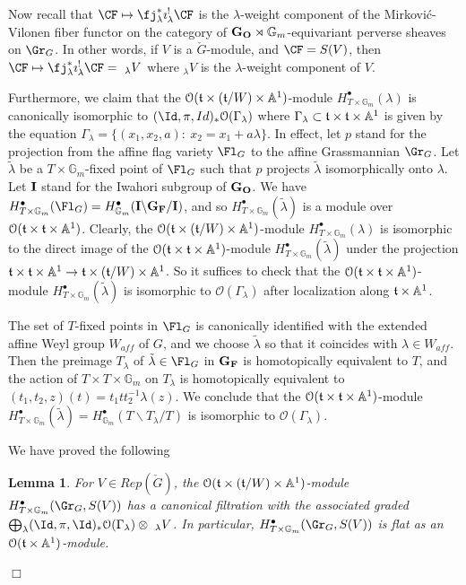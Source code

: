 \documentclass[11pt]{amsart}
\newtheorem{lem}{Lemma}
\theoremstyle{definition}
\theoremstyle{remark}
\renewcommand{\O}{{\mathcal O}}
\theoremstyle{remark}
\newcommand{\cal}{\mathcal}
\newcommand{\<}{\langle}
\renewcommand{\>}{\rangle}
\renewcommand{\t}{{\frak t}}
\newcommand{\LG}{{\check{G}}}
\renewcommand{\O}{{\cal O}}
\newcommand{\bI}{{\bf I}}
\newcommand{\GO}{{\bf G_O}}
\newcommand{\GF}{{\bf G_F}}
\newcommand{\Aone}{{\mathbb A}^1}
\newcommand{\Gm}{{{\mathbb G}_m}}
\begin{document}
Now recall that $\CF\mapsto\fj_\lambda^*\imath_\lambda^!\CF$ is the
$\lambda$-weight component of the Mirkovi\'c-Vilonen fiber functor on
the category of $\GO\rtimes\Gm$-equivariant perverse sheaves on $\Gr_G$.
In other words, if $V$ is a $\LG$-module, and $\CF=S(V)$, then
$\CF\mapsto\fj_\lambda^*\imath_\lambda^!\CF=\ _\lambda V$ where
$_\lambda V$ is the $\lambda$-weight component of $V$.

Furthermore, we claim that the $\O(\t\times(\t/W)\times\Aone)$-module
$H^\bullet_{T\times\Gm}(\lambda)$ is canonically isomorphic to
$(\Id,\pi,Id)_*\O(\Gamma_\lambda)$ where 
$\Gamma_\lambda\subset\t\times\t\times\Aone$ is given by the equation
$\Gamma_\lambda=\{(x_1,x_2,a):\ x_2=x_1+a\lambda\}$. In effect, 
let $p$ stand for the projection from the affine flag variety $\Fl_G$ to
the affine Grassmannian $\Gr_G$. Let $\tilde\lambda$ be a 
$T\times\Gm$-fixed point of $\Fl_G$ such that $p$ projects $\tilde\lambda$
isomorphically onto $\lambda$. Let $\bI$ stand for the Iwahori subgroup of
$\GO$. We have $H^\bullet_{T\times\Gm}(\Fl_G)=
H^\bullet_\Gm(\bI\backslash\GF/\bI)$, and so 
$H^\bullet_{T\times\Gm}({\tilde\lambda})$
is a module over $\O(\t\times\t\times\Aone)$. Clearly, the 
$\O(\t\times(\t/W)\times\Aone)$-module $H^\bullet_{T\times\Gm}(\lambda)$ is
isomorphic to the direct image of the 
$\O(\t\times\t\times\Aone)$-module $H^\bullet_{T\times\Gm}({\tilde\lambda})$
under the projection $\t\times\t\times\Aone\to\t\times(\t/W)\times\Aone$.
So it suffices to check that the
$\O(\t\times\t\times\Aone)$-module $H^\bullet_{T\times\Gm}({\tilde\lambda})$
is isomorphic to $\O(\Gamma_\lambda)$ after localization along $\t\times\Aone$.

The set of $T$-fixed points in $\Fl_G$ is canonically identified with the
extended affine Weyl group $W_{aff}$ of $G$, and we choose $\tilde\lambda$
so that it coincides 
with $\lambda\in W_{aff}$. Then the preimage $T_\lambda$ of 
${\tilde\lambda}\in\Fl_G$ in $\GF$ is homotopically equivalent to 
$T$, and the action of $T\times T\times\Gm$ on $T_\lambda$ is homotopically
equivalent to $(t_1,t_2,z)(t)=t_1tt_2^{-1}\lambda(z)$. We conclude that the
$\O(\t\times\t\times\Aone)$-module $H^\bullet_{T\times\Gm}({\tilde\lambda})=
H^\bullet_\Gm(T\backslash T_\lambda/T)$
is isomorphic to $\O(\Gamma_\lambda)$.

We have proved the following

\begin{lem}
\label{Harvard}
For $V\in Rep(\LG)$, the $\O(\t\times(\t/W)\times\Aone)$-module
$H^\bullet_{T\times\Gm}(\Gr_G,S(V))$ has a canonical filtration with
the associated graded $\bigoplus_\lambda (\Id,\pi,\Id)_*
\O(\Gamma_\lambda)\otimes\ _\lambda V$. In particular, 
$H^\bullet_{T\times\Gm}(\Gr_G,S(V))$ is flat as an $\O(\t\times\Aone)$-module.
\end{lem}
\hfill $\Box$
\end{document}
